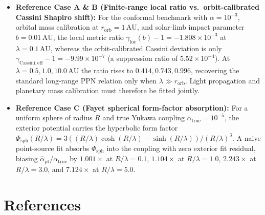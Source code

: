 \documentclass[
  american,
  11pt,
  letterpaper,
]{article}
\providecommand{\tightlist}{%
  \setlength{\itemsep}{0pt}\setlength{\parskip}{0pt}}
\begin{document}
\begin{itemize}
\tightlist
\item
  \textbf{Reference Case A \& B (Finite-range local ratio vs.~orbit-calibrated Cassini Shapiro shift):} For the conformal benchmark with \(\alpha = 10^{-3}\), orbital mass calibration at \(r_{\mathrm{orb}} = 1\,\mathrm{AU}\), and solar-limb impact parameter \(b = 0.01\,\mathrm{AU}\), the local metric ratio \(\gamma_{\mathrm{loc}}(b) - 1 = -1.808 \times 10^{-3}\) at \(\lambda = 0.1\,\mathrm{AU}\), whereas the orbit-calibrated Cassini deviation is only \(\gamma_{\mathrm{Cassini,eff}} - 1 = -9.99 \times 10^{-7}\) (a suppression ratio of \(5.52 \times 10^{-4}\)). At \(\lambda = 0.5, 1.0, 10.0\,\mathrm{AU}\) the ratio rises to \(0.414, 0.743, 0.996\), recovering the standard long-range PPN relation only when \(\lambda \gg r_{\mathrm{orb}}\). Light propagation and planetary mass calibration must therefore be fitted jointly.
\item
  \textbf{Reference Case C (Fayet spherical form-factor absorption):} For a uniform sphere of radius \(R\) and true Yukawa coupling \(\alpha_{\mathrm{true}} = 10^{-5}\), the exterior potential carries the hyperbolic form factor \(\Phi_{\mathrm{sph}}(R/\lambda) = 3((R/\lambda)\cosh(R/\lambda) - \sinh(R/\lambda))/(R/\lambda)^3\). A naive point-source fit absorbs \(\Phi_{\mathrm{sph}}\) into the coupling with zero exterior fit residual, biasing \(\hat{\alpha}_{\mathrm{pt}} / \alpha_{\mathrm{true}}\) by \(1.001\times\) at \(R/\lambda = 0.1\), \(1.104\times\) at \(R/\lambda = 1.0\), \(2.243\times\) at \(R/\lambda = 3.0\), and \(7.124\times\) at \(R/\lambda = 5.0\).
\end{itemize}

\section{References}\label{references}
\end{document}
